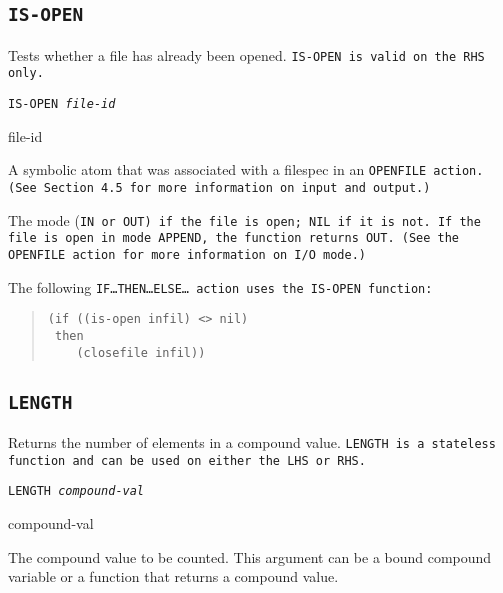 \subsection{\tt{IS-OPEN}}

Tests whether a file has already been opened. \tt{IS-OPEN} is valid on
the RHS only.

\Format

\tt{IS-OPEN} \it{file-id}

\begin{arguments}
\item[file-id]

  A symbolic atom that was associated with a filespec in an
  \tt{OPENFILE} action. (See Section 4.5 for more information on input
  and output.)
\end{arguments}

\ReturnValue

The mode (\tt{IN} or \tt{OUT}) if the file is open; \tt{NIL} if it is
not.  If the file is open in mode \tt{APPEND}, the function returns
\tt{OUT}.  (See the \tt{OPENFILE} action for more information on I/O
mode.)

\Example

The following \tt{IF}\ldots\tt{THEN}\ldots\tt{ELSE}\ldots{} action
uses the \tt{IS-OPEN} function:

\begin{quote}
\begin{verbatim}
(if ((is-open infil) <> nil)
 then
    (closefile infil))
\end{verbatim}
\end{quote}

\subsection{\tt{LENGTH}}

Returns the number of elements in a compound value. \tt{LENGTH} is a
stateless function and can be used on either the LHS or RHS.

\Format

\tt{LENGTH} \it{compound-val}

\begin{arguments}
\item[compound-val]

  The compound value to be counted. This argument can be a bound
  compound variable or a function that returns a compound value.
\end{arguments}

\ReturnValue

